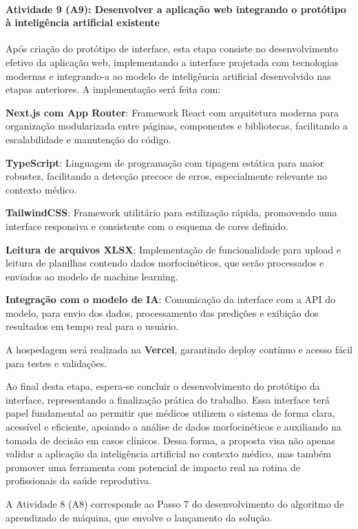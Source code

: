 \paragraph{\textbf{Atividade 9 (A9):}  Desenvolver a aplicação web integrando o protótipo à inteligência artificial existente}

Após criação do protótipo de interface, esta etapa consiste no desenvolvimento efetivo da aplicação web, implementando a interface projetada com tecnologias modernas e integrando-a ao modelo de inteligência artificial desenvolvido nas etapas anteriores. A implementação será feita com:

\textbf{Next.js com App Router}: Framework React com arquitetura moderna para organização modularizada entre páginas, componentes e bibliotecas, facilitando a escalabilidade e manutenção do código.

\textbf{TypeScript}: Linguagem de programação com tipagem estática para maior robustez, facilitando a detecção precoce de erros, especialmente relevante no contexto médico.

\textbf{TailwindCSS}: Framework utilitário para estilização rápida, promovendo uma interface responsiva e consistente com o esquema de cores definido.

\textbf{Leitura de arquivos XLSX}: Implementação de funcionalidade para upload e leitura de planilhas contendo dados morfocinéticos, que serão processados e enviados ao modelo de machine learning.

\textbf{Integração com o modelo de IA}: Comunicação da interface com a API do modelo, para envio dos dados, processamento das predições e exibição dos resultados em tempo real para o usuário.

A hospedagem será realizada na \textbf{Vercel}, garantindo deploy contínuo e acesso fácil para testes e validações.

Ao final desta etapa, espera-se concluir o desenvolvimento do protótipo da interface, representando a finalização prática do trabalho. Essa interface terá papel fundamental ao permitir que médicos utilizem o sistema de forma clara, acessível e eficiente, apoiando a análise de dados morfocinéticos e auxiliando na tomada de decisão em casos clínicos. Dessa forma, a proposta visa não apenas validar a aplicação da inteligência artificial no contexto médico, mas também promover uma ferramenta com potencial de impacto real na rotina de profissionais da saúde reprodutiva.

A Atividade 8 (A8) corresponde ao Passo 7 do desenvolvimento do algoritmo de aprendizado de máquina, que envolve o lançamento da solução.